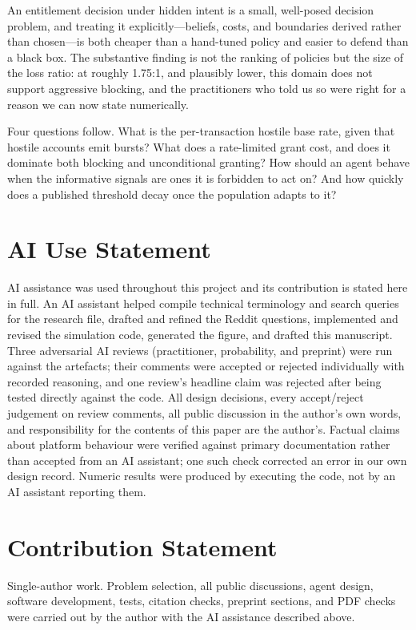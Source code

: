 \documentclass{article}
\begin{document}
An entitlement decision under hidden intent is a small, well-posed decision problem, and
treating it explicitly---beliefs, costs, and boundaries derived rather than chosen---is
both cheaper than a hand-tuned policy and easier to defend than a black box. The
substantive finding is not the ranking of policies but the size of the loss ratio: at
roughly 1.75:1, and plausibly lower, this domain does not support aggressive blocking, and
the practitioners who told us so were right for a reason we can now state numerically.

Four questions follow. What is the per-transaction hostile base rate, given that hostile
accounts emit bursts? What does a rate-limited grant cost, and does it dominate both
blocking and unconditional granting? How should an agent behave when the informative
signals are ones it is forbidden to act on? And how quickly does a published threshold
decay once the population adapts to it?

\section*{AI Use Statement}

AI assistance was used throughout this project and its contribution is stated here in full.
An AI assistant helped compile technical terminology and search queries for the research
file, drafted and refined the Reddit questions, implemented and revised the simulation code,
generated the figure, and drafted this manuscript. Three adversarial AI reviews
(practitioner, probability, and preprint) were run against the artefacts; their comments
were accepted or rejected individually with recorded reasoning, and one review's headline
claim was rejected after being tested directly against the code. All design decisions,
every accept/reject judgement on review comments, all public discussion in the author's own
words, and responsibility for the contents of this paper are the author's. Factual claims
about platform behaviour were verified against primary documentation rather than accepted
from an AI assistant; one such check corrected an error in our own design record. Numeric
results were produced by executing the code, not by an AI assistant reporting them.

\section*{Contribution Statement}

Single-author work. Problem selection, all public discussions, agent design, software
development, tests, citation checks, preprint sections, and PDF checks were carried out by
the author with the AI assistance described above.
\end{document}
